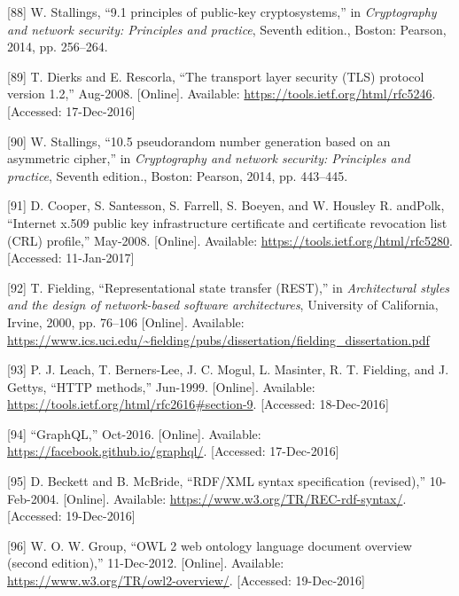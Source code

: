 \documentclass[12pt,english,a4paper,titlepage,cleardoublepage=empty,dottedtoc]{report}
\begin{document}
\hypertarget{ref-book_2014_chapter-9-1-public-key-crypto}{}
{[}88{]} W. Stallings, ``9.1 principles of public-key cryptosystems,''
in \emph{Cryptography and network security: Principles and practice},
Seventh edition., Boston: Pearson, 2014, pp. 256--264.

\hypertarget{ref-web_spec_tls}{}
{[}89{]} T. Dierks and E. Rescorla, ``The transport layer security (TLS)
protocol version 1.2,'' Aug-2008. {[}Online{]}. Available:
\url{https://tools.ietf.org/html/rfc5246}. {[}Accessed: 17-Dec-2016{]}

\hypertarget{ref-book_2014_chapter-14-5-pki}{}
{[}90{]} W. Stallings, ``10.5 pseudorandom number generation based on an
asymmetric cipher,'' in \emph{Cryptography and network security:
Principles and practice}, Seventh edition., Boston: Pearson, 2014, pp.
443--445.

\hypertarget{ref-web_spec_x509}{}
{[}91{]} D. Cooper, S. Santesson, S. Farrell, S. Boeyen, and W. Housley
R. andPolk, ``Internet x.509 public key infrastructure certificate and
certificate revocation list (CRL) profile,'' May-2008. {[}Online{]}.
Available: \url{https://tools.ietf.org/html/rfc5280}. {[}Accessed:
11-Jan-2017{]}

\hypertarget{ref-web_spec_rest}{}
{[}92{]} T. Fielding, ``Representational state transfer (REST),'' in
\emph{Architectural styles and the design of network-based software
architectures}, University of California, Irvine, 2000, pp. 76--106
{[}Online{]}. Available:
\url{https://www.ics.uci.edu/~fielding/pubs/dissertation/fielding_dissertation.pdf}

\hypertarget{ref-web_spec_http-methods}{}
{[}93{]} P. J. Leach, T. Berners-Lee, J. C. Mogul, L. Masinter, R. T.
Fielding, and J. Gettys, ``HTTP methods,'' Jun-1999. {[}Online{]}.
Available: \url{https://tools.ietf.org/html/rfc2616\#section-9}.
{[}Accessed: 18-Dec-2016{]}

\hypertarget{ref-web_spec_graphql}{}
{[}94{]} ``GraphQL,'' Oct-2016. {[}Online{]}. Available:
\url{https://facebook.github.io/graphql/}. {[}Accessed: 17-Dec-2016{]}

\hypertarget{ref-web_w3c-tr_rdf}{}
{[}95{]} D. Beckett and B. McBride, ``RDF/XML syntax specification
(revised),'' 10-Feb-2004. {[}Online{]}. Available:
\url{https://www.w3.org/TR/REC-rdf-syntax/}. {[}Accessed: 19-Dec-2016{]}

\hypertarget{ref-web_w3c-tr_owl}{}
{[}96{]} W. O. W. Group, ``OWL 2 web ontology language document overview
(second edition),'' 11-Dec-2012. {[}Online{]}. Available:
\url{https://www.w3.org/TR/owl2-overview/}. {[}Accessed: 19-Dec-2016{]}
\end{document}
